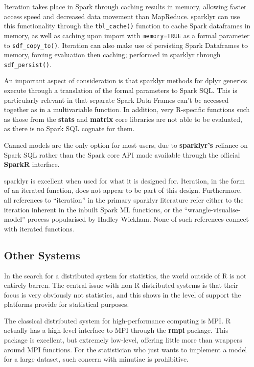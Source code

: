 Iteration takes place in Spark through caching results in memory, allowing faster access speed and decreased data movement than MapReduce\cite{zaharia2010spark}.
sparklyr can use this functionality through the \texttt{tbl\_cache()} function to cache Spark dataframes in memory, as well as caching upon import with \texttt{memory=TRUE} as a formal parameter to \texttt{sdf\_copy\_to()}.
Iteration can also make use of persisting Spark Dataframes to memory, forcing evaluation then caching; performed in sparklyr through \texttt{sdf\_persist()}.

An important aspect of consideration is that sparklyr methods for dplyr generics execute through a translation of the formal parameters to Spark SQL.
This is particularly relevant in that separate Spark Data Frames can't be accessed together as in a multivariable function.
In addition, very R-specific functions such as those from the \textbf{stats} and \textbf{matrix} core libraries are not able to be evaluated, as there is no Spark SQL cognate for them.

Canned models are the only option for most users, due to \textbf{sparklyr's} reliance on Spark SQL rather than the Spark core API made available through the official \textbf{SparkR} interface.

sparklyr is excellent when used for what it is designed for.
Iteration, in the form of an iterated function, does not appear to be part of this design. 
Furthermore, all references to ``iteration'' in the primary sparklyr literature refer either to the iteration inherent in the inbuilt Spark ML functions, or the ``wrangle-visualise-model'' process popularised by Hadley Wickham\cite{luraschi2019mastering}\cite{wickham2016r}.
None of such references connect with iterated functions.

\subsection{Other Systems}

In the search for a distributed system for statistics, the world outside of R is not entirely barren.
The central issue with non-R distributed systems is that their focus is very obviously not statistics, and this shows in the level of support the platforms provide for statistical purposes.

The classical distributed system for high-performance computing is MPI.
R actually has a high-level interface to MPI through the \textbf{rmpi} package.
This package is excellent, but extremely low-level, offering little more than wrappers around MPI functions.
For the statistician who just wants to implement a model for a large dataset, such concern with minutiae is prohibitive.\\

